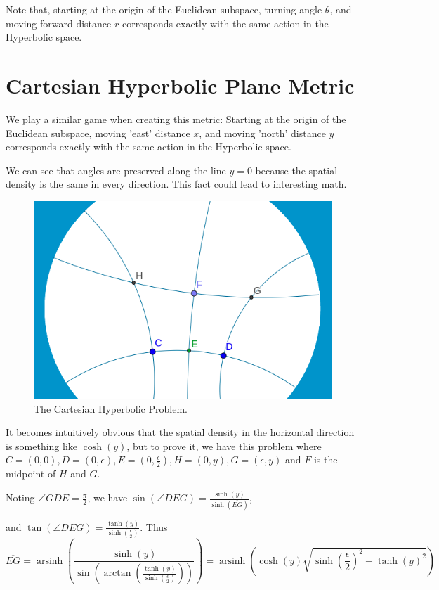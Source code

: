\documentclass[]{article}
\DeclareMathOperator{\arsinh}{arsinh}
\newcommand{\pqty}[1]{{\left(#1\right)}}
\numberwithin{equation}{section}
\begin{document}
	Note that, starting at the origin of the Euclidean subspace, turning angle $\theta$, and moving forward distance $r$ corresponds exactly with the same action in the Hyperbolic space.
	
	\section{Cartesian Hyperbolic Plane Metric}
	We play a similar game when creating this metric:
	Starting at the origin of the Euclidean subspace, moving 'east' distance $x$, and moving 'north' distance $y$ corresponds exactly with the same action in the Hyperbolic space.
	
	We can see that angles are preserved along the line $y=0$ because the spatial density is the same in every direction. This fact could lead to interesting math.
	
	\begin{figure}[h!]
		\includegraphics[width=\linewidth]{CartesianHyperbolicProblem.png}
		\caption{The Cartesian Hyperbolic Problem.}
		\label{fig:chp}
	\end{figure}
	
	It becomes intuitively obvious that the spatial density in the horizontal direction is something like $\cosh\pqty{y}$, but to prove it, we have this problem where
	$C=\pqty{0,0}, D=\pqty{0,\epsilon}, E=\pqty{0,\frac{\epsilon}{2}}, H=\pqty{0,y}, G=\pqty{\epsilon,y}$ and $F$ is the midpoint of $H$ and $G$.
	
	Noting $\angle{GDE}=\frac{\pi}{2}$, we have $\sin\pqty{\angle{DEG}}=\frac{\sinh\pqty{y}}{\sinh\pqty{\overline{EG}}}$,
	
	and $\tan\pqty{\angle{DEG}}=\frac{\tanh\pqty{y}}{\sinh\pqty{\frac{\epsilon}{2}}}$. Thus
	$$\overline{EG} = \arsinh\pqty{ \frac{\sinh\pqty{y}}{\sin\pqty{\arctan\pqty{\frac{\tanh\pqty{y}}{\sinh\pqty{\frac{\epsilon}{2}}}}}}}
	= \arsinh\pqty{
		\cosh\pqty{y}
		\sqrt{\sinh\pqty{\frac{\epsilon}{2}}^2+\tanh\pqty{y}^2}
	}$$
	
\end{document}
